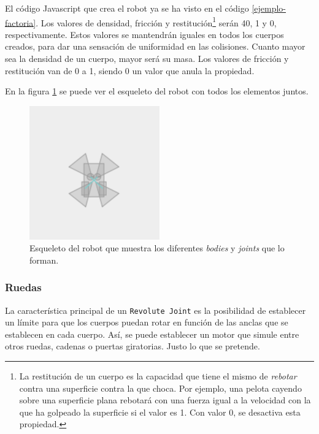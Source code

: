 {El código Javascript que crea el robot ya se ha visto en el código \ref{ejemplo-factoria}. Los valores de densidad, fricción y restitución\footnote{La restitución de un cuerpo es la capacidad que tiene el mismo de \emph{rebotar} contra una superficie contra la que choca. Por ejemplo, una pelota cayendo sobre una superficie plana rebotará con una fuerza igual a la velocidad con la que ha golpeado la superficie si el valor es 1. Con valor 0, se desactiva esta propiedad.} serán 40, 1 y 0, respectivamente. Estos valores se mantendrán iguales en todos los cuerpos creados, para dar una sensación de uniformidad en las colisiones. Cuanto mayor sea la densidad de un cuerpo, mayor será su masa. Los valores de fricción y restitución van de 0 a 1, siendo 0 un valor que anula la propiedad. 
 
 
En la figura \ref{fig:robot-skel} se puede ver el esqueleto del robot con todos los elementos juntos. 

\begin{figure}[!ht]
	\begin{centering}
		\includegraphics[width=0.5\textwidth]{images/robot-skel.png}
			\caption{Esqueleto del robot que muestra los diferentes \emph{bodies} y \emph{joints} que lo forman.}
				\label{fig:robot-skel}
	\end{centering}
\end{figure}


\subsubsection{Ruedas}

La característica principal de un \texttt{Revolute Joint} es la posibilidad de establecer  un límite para que los cuerpos puedan rotar en función de las anclas que se establecen en cada cuerpo. Así, se puede establecer un motor que simule entre otros ruedas, cadenas o puertas giratorias. Justo lo que se pretende.

}
